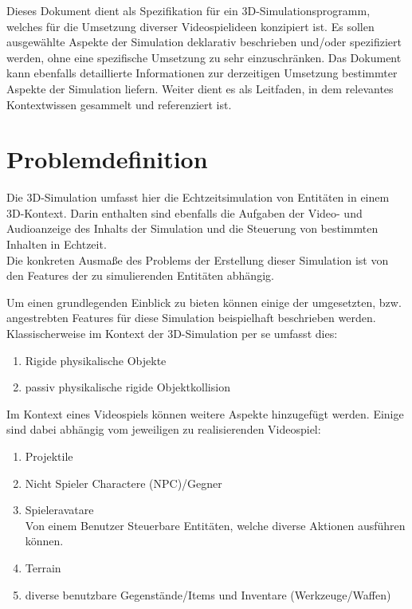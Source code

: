 
Dieses Dokument dient als Spezifikation für ein 3D-Simulationsprogramm, welches für die Umsetzung diverser Videospielideen konzipiert ist.
Es sollen ausgewählte Aspekte der Simulation deklarativ beschrieben und/oder spezifiziert werden, ohne eine spezifische Umsetzung zu sehr einzuschränken.
Das Dokument kann ebenfalls detaillierte Informationen zur derzeitigen Umsetzung bestimmter Aspekte der Simulation liefern.
Weiter dient es als Leitfaden, in dem relevantes Kontextwissen gesammelt und referenziert ist.

\section{Problemdefinition}
Die 3D-Simulation umfasst hier die Echtzeitsimulation von Entitäten in einem 3D-Kontext. Darin enthalten sind ebenfalls die Aufgaben der Video- und Audioanzeige des Inhalts der Simulation und die Steuerung von bestimmten Inhalten in Echtzeit.\\
Die konkreten Ausmaße des Problems der Erstellung dieser Simulation ist von den Features der zu simulierenden Entitäten abhängig.

Um einen grundlegenden Einblick zu bieten können einige der umgesetzten, bzw. angestrebten Features für diese Simulation beispielhaft beschrieben werden.\\
Klassischerweise im Kontext der 3D-Simulation per se umfasst dies:
\begin{enumerate}
\item Rigide physikalische Objekte
\item passiv physikalische rigide Objektkollision
\end{enumerate}

Im Kontext eines Videospiels können weitere Aspekte hinzugefügt werden. Einige sind dabei abhängig vom jeweiligen zu realisierenden Videospiel:
\begin{enumerate}
\item Projektile
\item Nicht Spieler Charactere (NPC)/Gegner
\item Spieleravatare\\
Von einem Benutzer Steuerbare Entitäten, welche diverse Aktionen ausführen können.
\item Terrain
\item diverse benutzbare Gegenstände/Items und Inventare (Werkzeuge/Waffen)
\end{enumerate}

